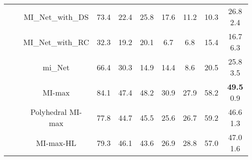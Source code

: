 \documentclass[preprint]{elsarticle}
\newcommand\MILS{MI-max}
\newcommand\mimaxaddlayerS{MI-max-HL}
\newcommand\MaxOfMaxS{Polyhedral MI-max}
\begin{document}
\begin{savenotes}
\begin{table*}[h]
{\begin{tabular}{|c|c|c|cccccc|c|}
 & & MI\_Net\_with\_DS \citep{wang_revisiting_2018}  & 73.4   & 22.4   & 25.8   & 17.6 & 11.2  & 10.3 & 26.8    2.4   \\
& &   MI\_Net\_with\_RC \citep{wang_revisiting_2018}& 32.3   & 19.2   & 20.1   & 6.7  & 6.8  & 15.4   & 16.7    6.3   \\  
 & & mi\_Net \citep{wang_revisiting_2018} & 66.4  & 30.3   & 14.9   & 14.4   & 8.6   & 20.5   & 25.8    3.5   \\
\cline{3-10}
& & \MILS{}   & 84.1  & 47.4 & 48.2  & 30.9  & 27.9  & 58.2  & {\color{red} \bf 49.5 }   0.9   \\ 
& & \MaxOfMaxS{}  & 77.8   & 44.7   & 45.5   & 25.6  & 26.7  & 59.2   & 46.6    1.3   \\ 
& & \mimaxaddlayerS{} & 79.3  & 46.1  & 43.6  & 26.9  & 28.8  & 57.0  & 47.0    1.6   \\ 
\hline
\end{tabular}
}
\end{table*}
\end{savenotes}
\end{document}
